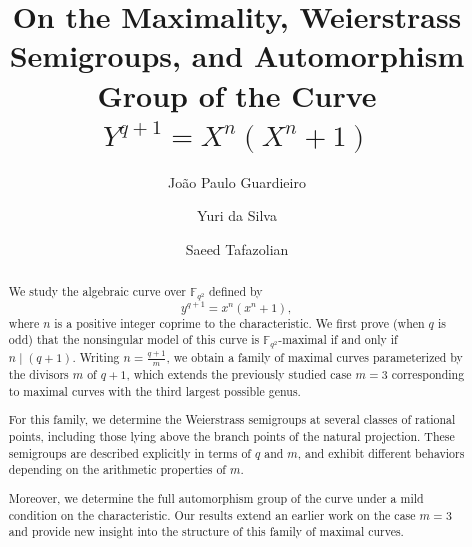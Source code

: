 \documentclass[12pt]{amsart}
\theoremstyle{remark}
\theoremstyle{definition}
\begin{document}
	
	
	\title[Maximality, Weierstrass Semigroups, and Automorphism Group 
of $Y^{q+1} = X^n(X^n + 1)$]{On the Maximality, Weierstrass Semigroups, and Automorphism Group 
of the Curve $Y^{q+1} = X^n(X^n + 1)$}
	\author{João Paulo Guardieiro}
	\address{Centro de Ciências Exatas e Tecnologia, Av. dos Portugueses, 1966, 65.080-805 São Luís-MA, Brazil.}
	
	\author{Yuri da Silva}
	\address{Instituto de Matemática, Estatística e Computação Científica da Universidade Estadual de Campinas, R. Sérgio Buarque de Holanda, 651, 13083-970 Campinas-SP, Brazil.}
	
	\author{Saeed Tafazolian}
	\address{Instituto de Matemática, Estatística e Computação Científica da Universidade Estadual de Campinas, R. Sérgio Buarque de Holanda, 651, 13083-970 Campinas-SP, Brazil.}
	
	
	
	\begin{abstract}
		We study the algebraic curve over $\mathbb{F}_{q^2}$ defined by
		\[
		y^{q+1} = x^n(x^n+1),
		\]
		where $n$ is a positive integer coprime to the characteristic. We first prove (when $q$ is odd) that the nonsingular model of this curve is $\mathbb{F}_{q^2}$-maximal if and only if $n \mid (q+1)$. Writing $n = \frac{q+1}{m}$, we obtain a family of maximal curves parameterized by the divisors $m$ of $q+1$, which extends the previously studied case $m=3$ corresponding to maximal curves with the third largest possible genus.
		
		For this family, we determine the Weierstrass semigroups at several classes of rational points, including those lying above the branch points of the natural projection. These semigroups are described explicitly in terms of $q$ and $m$, and exhibit different behaviors depending on the arithmetic properties of $m$.
		
		Moreover, we determine the full automorphism group of the curve under a mild condition on the characteristic. Our results extend an earlier work on the case $m=3$ and provide new insight into the structure of this family of maximal curves.
	\end{abstract}
\maketitle
    
\end{document}
